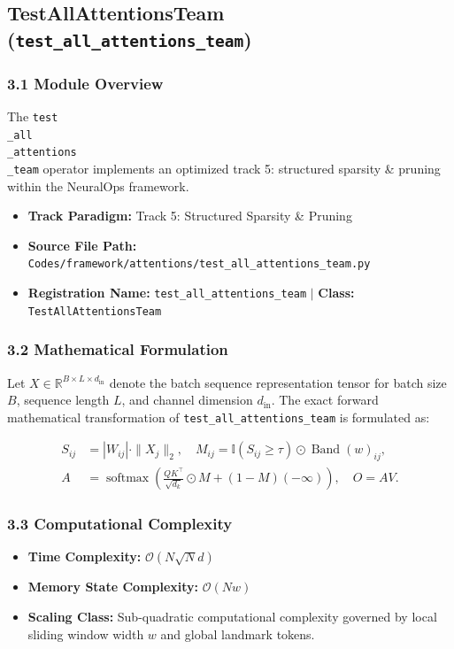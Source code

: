 \subsection{TestAllAttentionsTeam (\texttt{test\_all\_attentions\_team})}
\label{sec:app_module_test_all_attentions_team}

\subsubsection*{3.1 Module Overview}
The \texttt{test\\_all\\_attentions\\_team} operator implements an optimized track 5: structured sparsity \& pruning within the NeuralOps framework.
\begin{itemize}
    \item \textbf{Track Paradigm:} Track 5: Structured Sparsity & Pruning
    \item \textbf{Source File Path:} \texttt{Codes/framework/attentions/test\_all\_attentions\_team.py}
    \item \textbf{Registration Name:} \texttt{test\_all\_attentions\_team} $\mid$ \textbf{Class:} \texttt{TestAllAttentionsTeam}
\end{itemize}

\subsubsection*{3.2 Mathematical Formulation}
Let $X \in \mathbb{R}^{B \times L \times d_{\text{in}}}$ denote the batch sequence representation tensor for batch size $B$, sequence length $L$, and channel dimension $d_{\text{in}}$. The exact forward mathematical transformation of \texttt{test\_all\_attentions\_team} is formulated as:

\begin{align}
S_{ij} &= |W_{ij}| \cdot \|X_j\|_2, \quad M_{ij} = \mathbb{I}(S_{ij} \ge \tau) \odot \operatorname{Band}(w)_{ij}, \\
A &= \operatorname{softmax}\left(\frac{Q K^\top}{\sqrt{d_k}} \odot M + (1 - M)(-\infty)\right), \quad O = A V.
\end{align}


\subsubsection*{3.3 Computational Complexity}
\begin{itemize}
    \item \textbf{Time Complexity:} $\mathcal{O}(N \sqrt{N} d)$
    \item \textbf{Memory State Complexity:} $\mathcal{O}(N w)$
    \item \textbf{Scaling Class:} Sub-quadratic computational complexity governed by local sliding window width $w$ and global landmark tokens.
\end{itemize}

